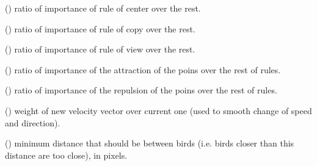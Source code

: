 \documentclass[a4paper,11pt,oneside,english]{sphinxmanual}
\begin{document}
\begin{fulllineitems}
() ratio of importance of rule of center over the rest.

\end{fulllineitems}



\begin{fulllineitems}
() ratio of importance of rule of copy over the rest.

\end{fulllineitems}



\begin{fulllineitems}
() ratio of importance of rule of view over the rest.

\end{fulllineitems}



\begin{fulllineitems}
() ratio of importance of the attraction of the poins over the rest of rules.

\end{fulllineitems}



\begin{fulllineitems}
() ratio of importance of the repulsion of the poins over the rest of rules.

\end{fulllineitems}



\begin{fulllineitems}
() weight of new velocity vector over current one (used to smooth change of speed and direction).

\end{fulllineitems}


\bigskip 
\bigskip 


\begin{fulllineitems}
() minimum distance that should be between birds (i.e. birds closer than this distance are too close), in pixels.

\end{fulllineitems}
\end{document}
